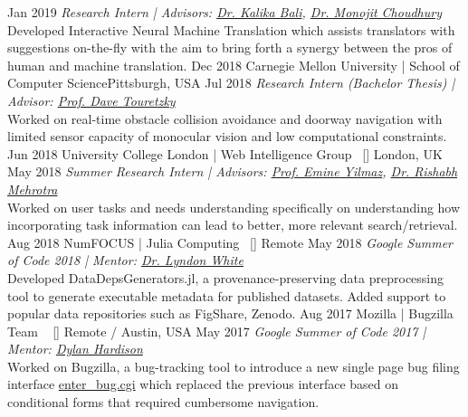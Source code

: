 \begin{experiences}
{    }
\researchexperience
    {}   {}{}{}
    {Jan 2019} {\textit{Research Intern | Advisors:  \href{https://www.microsoft.com/en-us/research/people/kalikab/}{Dr. Kalika Bali}, 
    \href{https://www.microsoft.com/en-us/research/people/monojitc/}{Dr. Monojit Choudhury}
    }\\
    Developed Interactive Neural Machine Translation which assists translators with suggestions on-the-fly with the aim to bring forth a synergy between the pros of human and machine translation.
    }
  \emptySeparator
 \researchexperience
    {Dec 2018}   {Carnegie Mellon University | School of Computer Science}{Pittsburgh, USA}{}
    {Jul 2018} {\textit{Research Intern (Bachelor Thesis) | Advisor:  \href{http://www.cs.cmu.edu/~dst/}{Prof. Dave Touretzky}}\\
    Worked on real-time obstacle collision avoidance and doorway navigation with limited sensor capacity of monocular vision and low computational constraints. 
    }
  \emptySeparator
   \researchexperience
    {Jun 2018}   {University College London | Web Intelligence Group{\normalfont  ~ [\href{http://wi.cs.ucl.ac.uk/index.php/people/}{\small{\websiteSymbol}}]
    }}{London, UK}{}
    {May 2018} {\textit{Summer Research Intern | Advisors: \href{https://sites.google.com/site/emineyilmaz/}{Prof. Emine Yilmaz}, \href{http://rishabhmehrotra.com/}{Dr. Rishabh Mehrotra}}\\
    Worked on user tasks and needs understanding specifically on understanding how incorporating task information can lead to better, more relevant search/retrieval.
    }
  \emptySeparator
    \researchexperience
    {Aug 2018}   {NumFOCUS | Julia Computing{\normalfont  ~ [\href{https://numfocus.org/blog/google-summer-of-code-2018-julia-cohort}{\small{\websiteSymbol}}]
    }}{Remote}{}
    {May 2018} {\textit{Google Summer of Code 2018 | Mentor: \href{https://www.oxinabox.net/}{Dr. Lyndon White}}\\
    Developed DataDepsGenerators.jl, a provenance-preserving data preprocessing tool to generate executable metadata for published datasets. Added support to popular data repositories such as FigShare, Zenodo.
    }
  \emptySeparator
   \researchexperience
    {Aug 2017}   {Mozilla | Bugzilla Team {\normalfont  ~ [\href{https://wiki.mozilla.org/BMO}{\small{\websiteSymbol}}]
    }}{Remote / Austin, USA}{}
    {May 2017} {\textit{Google Summer of Code 2017 | Mentor: \href{https://www.linkedin.com/in/dylanwh/}{Dylan Hardison}}\\
    Worked on Bugzilla, a bug-tracking tool to introduce a new single page bug filing interface \href{https://bugzilla.mozilla.org/enter_bug.cgi}{enter\_bug.cgi} which replaced the previous interface based on conditional forms that required cumbersome navigation.
    }
  
\end{experiences}
\vspace{-4mm}
